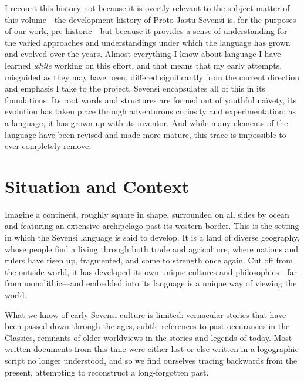 I recount this history not because it is overtly relevant to the subject matter of this volume—the development history of Proto-Jastu-Sevensi is, for the purposes of our work, pre-historic—but because it provides a sense of understanding for the varied approaches and understandings under which the language has grown and evolved over the years.
Almost everything I know about language I have learned \emph{while} working on this effort, and that means that my early attempts, misguided as they may have been, differed significantly from the current direction and emphasis I take to the project.
Sevensi encapsulates all of this in its foundations: Its root words and structures are formed out of youthful naïvety, its evolution has taken place through adventurous curiosity and experimentation; as a language, it has grown up with its inventor.
And while many elements of the language have been revised and made more mature, this trace is impossible to ever completely remove.

\section*{Situation and Context}

Imagine a continent, roughly square in shape, surrounded on all sides by ocean and featuring an extensive archipelago past its western border.
This is the setting in which the Sevensi language is said to develop.
It is a land of diverse geography, whose people find a living through both trade and agriculture, where nations and rulers have risen up, fragmented, and come to strength once again.
Cut off from the outside world, it has developed its own unique cultures and philosophies—far from monolithic—and embedded into its language is a unique way of viewing the world.

What we know of early Sevensi culture is limited: vernacular stories that have been passed down through the ages, subtle  references to past occurances in the Classics, remnants of older worldviews in the stories and legends of today.
Most written documents from this time were either lost or else written in a logographic script no longer understood, and so we find ourselves tracing backwards from the present, attempting to reconstruct a long-forgotten past.

